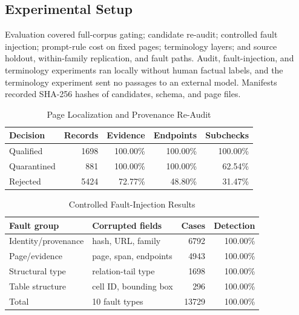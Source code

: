 \documentclass[conference,a4paper]{IEEEtran}
\begin{document}
\subsection{Experimental Setup}

Evaluation covered full-corpus gating; candidate re-audit; controlled fault injection; prompt-rule cost on fixed pages; terminology layers; and source holdout, within-family replication, and fault paths. Audit, fault-injection, and terminology experiments ran locally without human factual labels, and the terminology experiment sent no passages to an external model. Manifests recorded SHA-256 hashes of candidates, schema, and page files.

\begin{table}[t]
\caption{Page Localization and Provenance Re-Audit}
\label{tab:audit}
\centering
\footnotesize
\setlength{\tabcolsep}{3.2pt}
\begin{tabular}{lrrrr}
\toprule
Decision & Records & Evidence & Endpoints & Subchecks \\
\midrule
Qualified   & 1698 & 100.00\% & 100.00\% & 100.00\% \\
Quarantined & 881  & 100.00\% & 100.00\% & 62.54\% \\
Rejected    & 5424 & 72.77\%  & 48.80\%  & 31.47\% \\
\bottomrule
\end{tabular}
\end{table}

\begin{table}[t]
\caption{Controlled Fault-Injection Results}
\label{tab:mutation}
\centering
\footnotesize
\setlength{\tabcolsep}{3.0pt}
\begin{tabular}{llrr}
\toprule
Fault group & Corrupted fields & Cases & Detection \\
\midrule
Identity/provenance & hash, URL, family & 6792 & 100.00\% \\
Page/evidence       & page, span, endpoints & 4943 & 100.00\% \\
Structural type     & relation-tail type & 1698 & 100.00\% \\
Table structure     & cell ID, bounding box & 296 & 100.00\% \\
\midrule
Total & 10 fault types & 13729 & 100.00\% \\
\bottomrule
\end{tabular}
\end{table}
\end{document}
